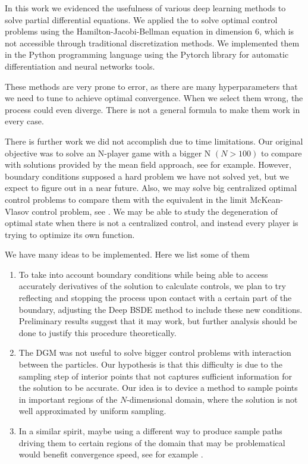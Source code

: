 In this work we evidenced the usefulness of various deep learning methods to solve partial differential equations. We applied the to solve optimal control problems using the Hamilton-Jacobi-Bellman equation in dimension 6, which is not accessible through traditional discretization methods. We implemented them in the Python programming language using the Pytorch library for automatic differentiation and neural networks tools.

These methods are very prone to error, as there are many hyperparameters that we need to tune to achieve optimal convergence. When we select them wrong, the process could even diverge. There is not a general formula to make them work in every case.

There is further work we did not accomplish due to time limitations. Our original objective was to solve an N-player game with a bigger N $(N>100)$ to compare with solutions provided by the mean field approach, see for example\cite{achdou_mean_2020}. However, boundary conditions supposed a hard problem we have not solved yet, but we expect to figure out in a near future. Also, we may solve big centralized optimal control problems to compare them with the equivalent in the limit McKean-Vlasov control problem, see \cite{carmona_control_2013}. We may be able to study the degeneration of optimal state when there is not a centralized control, and instead every player is trying to optimize its own function.

We have many ideas to be implemented. Here we list some of them 
\begin{enumerate}
	\item To take into account boundary conditions while being able to access accurately derivatives of the solution to calculate controls, we plan to try reflecting and stopping the process upon contact with a certain part of the boundary, adjusting the Deep BSDE method to include these new conditions. Preliminary results suggest that it may work, but further analysis should be done to justify this procedure theoretically.
	\item The DGM was not useful to solve bigger control problems with interaction between the particles. Our hypothesis is that this difficulty is due to the sampling step of interior points that not captures sufficient information for the solution to be accurate. Our idea is to device a method to sample points in important regions of the $N$-dimensional domain, where the solution is not well approximated by uniform sampling.
	\item In a similar spirit, maybe using a different way to produce sample paths driving them to certain regions of the domain that may be problematical would benefit convergence speed, see for example \cite{nusken_solving_2023}. 
\end{enumerate}    